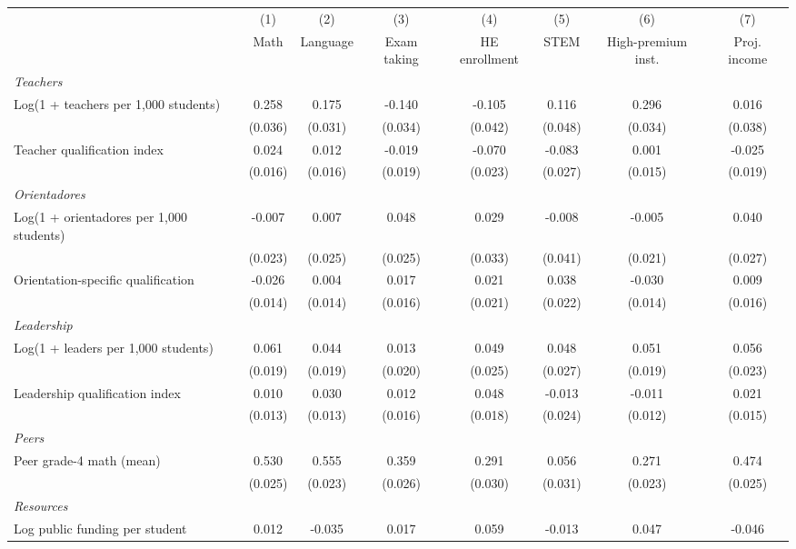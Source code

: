 \begin{tabular}{lccccccc}
\toprule
 & (1) & (2) & (3) & (4) & (5) & (6) & (7) \\
 & Math & Language & Exam taking & HE enrollment & STEM & High-premium inst. & Proj. income \\
\midrule
\multicolumn{8}{l}{\textit{Teachers}} \\
\quad Log(1 + teachers per 1,000 students) & 0.258 & 0.175 & -0.140 & -0.105 & 0.116 & 0.296 & 0.016 \\
 & (0.036) & (0.031) & (0.034) & (0.042) & (0.048) & (0.034) & (0.038) \\
\quad Teacher qualification index & 0.024 & 0.012 & -0.019 & -0.070 & -0.083 & 0.001 & -0.025 \\
 & (0.016) & (0.016) & (0.019) & (0.023) & (0.027) & (0.015) & (0.019) \\
\multicolumn{8}{l}{\textit{Orientadores}} \\
\quad Log(1 + orientadores per 1,000 students) & -0.007 & 0.007 & 0.048 & 0.029 & -0.008 & -0.005 & 0.040 \\
 & (0.023) & (0.025) & (0.025) & (0.033) & (0.041) & (0.021) & (0.027) \\
\quad Orientation-specific qualification & -0.026 & 0.004 & 0.017 & 0.021 & 0.038 & -0.030 & 0.009 \\
 & (0.014) & (0.014) & (0.016) & (0.021) & (0.022) & (0.014) & (0.016) \\
\multicolumn{8}{l}{\textit{Leadership}} \\
\quad Log(1 + leaders per 1,000 students) & 0.061 & 0.044 & 0.013 & 0.049 & 0.048 & 0.051 & 0.056 \\
 & (0.019) & (0.019) & (0.020) & (0.025) & (0.027) & (0.019) & (0.023) \\
\quad Leadership qualification index & 0.010 & 0.030 & 0.012 & 0.048 & -0.013 & -0.011 & 0.021 \\
 & (0.013) & (0.013) & (0.016) & (0.018) & (0.024) & (0.012) & (0.015) \\
\multicolumn{8}{l}{\textit{Peers}} \\
\quad Peer grade-4 math (mean) & 0.530 & 0.555 & 0.359 & 0.291 & 0.056 & 0.271 & 0.474 \\
 & (0.025) & (0.023) & (0.026) & (0.030) & (0.031) & (0.023) & (0.025) \\
\multicolumn{8}{l}{\textit{Resources}} \\
\quad Log public funding per student & 0.012 & -0.035 & 0.017 & 0.059 & -0.013 & 0.047 & -0.046 \\

\end{tabular}

